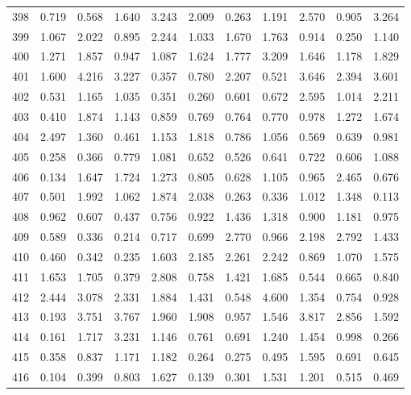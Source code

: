 \begin{tabular}{lrrrrrrrrrr}
398 &  0.719 &  0.568 &  1.640 &  3.243 &  2.009 &  0.263 &  1.191 &  2.570 &  0.905 &  3.264 \\
399 &  1.067 &  2.022 &  0.895 &  2.244 &  1.033 &  1.670 &  1.763 &  0.914 &  0.250 &  1.140 \\
400 &  1.271 &  1.857 &  0.947 &  1.087 &  1.624 &  1.777 &  3.209 &  1.646 &  1.178 &  1.829 \\
401 &  1.600 &  4.216 &  3.227 &  0.357 &  0.780 &  2.207 &  0.521 &  3.646 &  2.394 &  3.601 \\
402 &  0.531 &  1.165 &  1.035 &  0.351 &  0.260 &  0.601 &  0.672 &  2.595 &  1.014 &  2.211 \\
403 &  0.410 &  1.874 &  1.143 &  0.859 &  0.769 &  0.764 &  0.770 &  0.978 &  1.272 &  1.674 \\
404 &  2.497 &  1.360 &  0.461 &  1.153 &  1.818 &  0.786 &  1.056 &  0.569 &  0.639 &  0.981 \\
405 &  0.258 &  0.366 &  0.779 &  1.081 &  0.652 &  0.526 &  0.641 &  0.722 &  0.606 &  1.088 \\
406 &  0.134 &  1.647 &  1.724 &  1.273 &  0.805 &  0.628 &  1.105 &  0.965 &  2.465 &  0.676 \\
407 &  0.501 &  1.992 &  1.062 &  1.874 &  2.038 &  0.263 &  0.336 &  1.012 &  1.348 &  0.113 \\
408 &  0.962 &  0.607 &  0.437 &  0.756 &  0.922 &  1.436 &  1.318 &  0.900 &  1.181 &  0.975 \\
409 &  0.589 &  0.336 &  0.214 &  0.717 &  0.699 &  2.770 &  0.966 &  2.198 &  2.792 &  1.433 \\
410 &  0.460 &  0.342 &  0.235 &  1.603 &  2.185 &  2.261 &  2.242 &  0.869 &  1.070 &  1.575 \\
411 &  1.653 &  1.705 &  0.379 &  2.808 &  0.758 &  1.421 &  1.685 &  0.544 &  0.665 &  0.840 \\
412 &  2.444 &  3.078 &  2.331 &  1.884 &  1.431 &  0.548 &  4.600 &  1.354 &  0.754 &  0.928 \\
413 &  0.193 &  3.751 &  3.767 &  1.960 &  1.908 &  0.957 &  1.546 &  3.817 &  2.856 &  1.592 \\
414 &  0.161 &  1.717 &  3.231 &  1.146 &  0.761 &  0.691 &  1.240 &  1.454 &  0.998 &  0.266 \\
415 &  0.358 &  0.837 &  1.171 &  1.182 &  0.264 &  0.275 &  0.495 &  1.595 &  0.691 &  0.645 \\
416 &  0.104 &  0.399 &  0.803 &  1.627 &  0.139 &  0.301 &  1.531 &  1.201 &  0.515 &  0.469 \\

\end{tabular}
